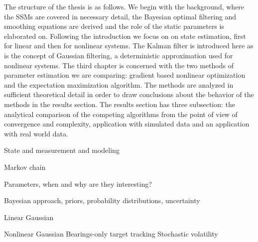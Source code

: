 



The structure of the thesis is as follows. We begin with the background, where
the SSMs are covered in necessary detail, the Bayesian optimal filtering
and smoothing equations are derived and the role of the static parameters is elaborated
on. Following the introduction we focus on on state estimation, first for linear
and then for nonlinear systems. The Kalman filter is introduced here as is the
concept of Gaussian filtering, a deterministic approximation used for nonlinear systems. 
The third chapter is concerned with the two methods
of parameter estimation we are comparing: gradient based nonlinear optimization
and the expectation maximization algorithm. The methods are analyzed in sufficient
theoretical detail in order to draw conclusions about the behavior of the methods
in the results section. The results section has three subsection: the analytical 
comparison of the competing algorithms from the point of view of convergence
and complexity, application with simulated data and an application with real world data.

State and measurement and modeling

Markov chain

Parameters, when and why are they interesting?

Bayesian approach, priors, probability distributions, uncertainty

Linear Gaussian 
  


Nonlinear Gaussian
  Bearings-only target tracking
  Stochastic volatility



